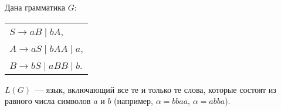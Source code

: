 \begin{ex}
  Дана грамматика $G$:
  \begin{center}
    \begin{tabular}{l}
      $S \to aB \mid bA$,\\
      $A \to aS \mid bAA \mid a$,\\
      $B \to bS \mid aBB \mid b$.\\
    \end{tabular}
  \end{center}
  $L(G)$~--- язык, включающий все те и только те слова, которые
  состоят из равного числа символов $a$ и $b$ (например, $\alpha =
  bbaa$, $\alpha = abba$).
\end{ex}



